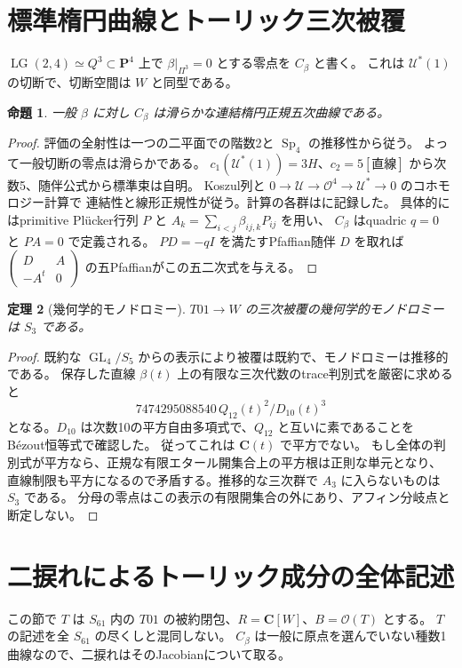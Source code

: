 \documentclass[11pt,a4paper]{ltjsarticle}
\newcommand{\CC}{\mathbf C}
\newcommand{\PP}{\mathbf P}
\DeclareMathOperator{\Sp}{Sp}
\DeclareMathOperator{\GL}{GL}
\newtheorem{theorem}{定理}[section]
\newtheorem{proposition}[theorem]{命題}
\theoremstyle{remark}
\begin{document}
\section{標準楕円曲線とトーリック三次被覆}\label{sec:canonical-curve}
$\operatorname{LG}(2,4)\simeq Q^3\subset\PP^4$ 上で
$\beta|_{\Pi^3}=0$ とする零点を $C_\beta$ と書く。
これは $\mathcal U^*(1)$ の切断で、切断空間は $W$ と同型である。

\begin{proposition}
一般 $\beta$ に対し $C_\beta$ は滑らかな連結楕円正規五次曲線である。
\end{proposition}
\begin{proof}
評価の全射性は一つの二平面での階数2と $\Sp_4$ の推移性から従う。
よって一般切断の零点は滑らかである。
$c_1(\mathcal U^*(1))=3H$、$c_2=5[\text{直線}]$ から次数5、随伴公式から標準束は自明。
Koszul列と $0\to\mathcal U\to\mathcal O^4\to\mathcal U^*\to0$ のコホモロジー計算で
連結性と線形正規性が従う。計算の各群は\cite{canonical-curve-new}に記録した。
具体的にはprimitive Pl\"ucker行列 $P$ と $A_k=\sum_{i<j}\beta_{ij,k}P_{ij}$ を用い、
$C_\beta$ はquadric $q=0$ と $PA=0$ で定義される。
$PD=-qI$ を満たすPfaffian随伴 $D$ を取れば
$\left(\begin{smallmatrix}D&A\\-A^t&0\end{smallmatrix}\right)$ の五Pfaffianがこの五二次式を与える。
\end{proof}

\begin{theorem}[幾何学的モノドロミー]
$T01\to W$ の三次被覆の幾何学的モノドロミーは $S_3$ である。
\end{theorem}
\begin{proof}
既約な $\GL_4/S_5$ からの表示により被覆は既約で、モノドロミーは推移的である。
保存した直線 $\beta(t)$ 上の有限な三次代数のtrace判別式を厳密に求めると
\[
 7474295088540\, Q_{12}(t)^2/D_{10}(t)^3
\]
となる。$D_{10}$ は次数10の平方自由多項式で、$Q_{12}$ と互いに素であることを
B\'ezout恒等式で確認した\cite{toric-monodromy-new}。
従ってこれは $\CC(t)$ で平方でない。
もし全体の判別式が平方なら、正規な有限エタール開集合上の平方根は正則な単元となり、
直線制限も平方になるので矛盾する。推移的な三次群で $A_3$ に入らないものは $S_3$ である。
分母の零点はこの表示の有限開集合の外にあり、アフィン分岐点と断定しない。
\end{proof}


\section{二捩れによるトーリック成分の全体記述}\label{sec:toric-global}
この節で $T$ は $S_{61}$ 内の $T01$ の被約閉包、$R=\CC[W]$、$B=\mathcal O(T)$ とする。
$T$ の記述を全 $S_{61}$ の尽くしと混同しない。
$C_\beta$ は一般に原点を選んでいない種数1曲線なので、二捩れはそのJacobianについて取る。
\end{document}

